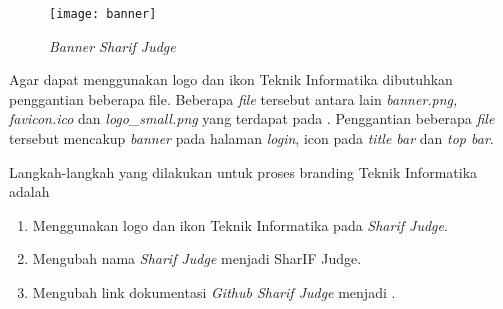 \begin{figure}[H]
	\centering  
	\texttt{[image: banner]}  
	\caption[\textit{Banner Sharif Judge}]{\textit{Banner Sharif Judge}} 
	\label{fig:banner} 
\end{figure} 

Agar dapat menggunakan logo dan ikon Teknik Informatika dibutuhkan penggantian beberapa file. Beberapa \textit{file} tersebut antara lain \textit{banner.png, favicon.ico} dan \textit{logo\_small.png} yang terdapat pada . Penggantian beberapa \textit{file} tersebut mencakup \textit{banner} pada halaman \textit{login}, icon pada \textit{title bar} dan \textit{top bar}.

Langkah-langkah yang dilakukan untuk proses branding Teknik Informatika adalah
\begin{enumerate}
	\item Menggunakan logo dan ikon Teknik Informatika pada \textit{Sharif Judge}.
	\item Mengubah nama \textit{Sharif Judge} menjadi SharIF Judge.
	\item Mengubah link dokumentasi \textit{Github Sharif Judge} menjadi .
\end{enumerate}